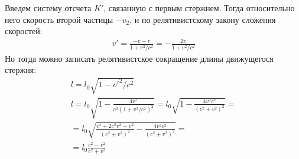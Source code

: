 \documentclass[a5paper,10pt]{article}\usepackage[usenames,dvipsnames]{color}
\begin{document}
\begin{figure}[H]
    \centering
{}
\vspace{-1em}
\end{figure}
Введем систему отсчета $K'$, связанную с первым стержнем. Тогда относительно него скорость второй частицы $-v_2$, и по релятивистскому закону сложения скоростей: 
\begin{gather*} 
    v'=\frac{-v-v}{1+v^2/c^2}=-\frac{2v}{1+v^2/c^2}
\end{gather*}
Но тогда можно записать релятивистское сокращение длины движущегося стержня:
\begin{gather*} 
    l=l_0\sqrt{1-v'^2/c^2}\\
    l=l_0\sqrt{1-\frac{4v^2}{c^2(1+v^2/c^2)^2}}=
    l_0\sqrt{1-\frac{4v^2c^2}{(c^2+v^2)^2}}=\\
    =l_0\sqrt{\frac{c^4+2c^2v^2+v^2}{(c^2+v^2)^2}-\frac{4v^2c^2}{(c^2+v^2)^2}}=\\=
    l_0\frac{c^2-v^2}{c^2+v^2}
\end{gather*}
\end{document}
